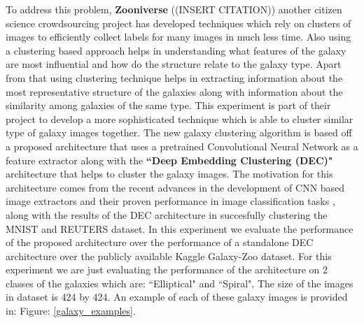 \documentclass{article}
\begin{document}
To address this problem, \textbf{Zooniverse} ((INSERT CITATION)) another citizen science crowdsourcing project has developed techniques which rely on clusters of images to efficiently collect labels for many images in much less time. Also using a clustering based approach helps in understanding what features of the galaxy are most influential and how do the structure relate to the galaxy type. Apart from that using clustering technique helps in extracting information about the most representative structure of the galaxies along with information about the similarity among galaxies of the same type. This experiment is part of their project to develop a more sophisticated technique which is able to cluster similar type of galaxy images together. The new galaxy clustering algorithm is based off a proposed architecture that uses a pretrained Convolutional Neural Network as a feature extractor along with the \textbf{``Deep Embedding Clustering (DEC)"} \cite{dec} architecture that helps to cluster the galaxy images. The motivation for this architecture comes from the recent advances in the development of CNN based image extractors and their proven performance in image classification tasks \cite{imagenet}, along with the results of the DEC architecture in succesfully clustering the MNIST \cite{mnist} and REUTERS \cite{reuters} dataset. In this experiment we evaluate the performance of the proposed architecture over the performance of a standalone DEC architecture over the publicly available Kaggle Galaxy-Zoo dataset. For this experiment we are just evaluating the performance of the architecture on 2 classes of the galaxies which are: ``Elliptical" and ``Spiral". The size of the images in dataset is 424 by 424. An example of each of these galaxy images is provided in: Figure: \ref{galaxy_examples}. 
\end{document}
